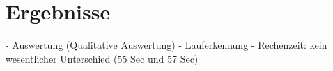\chapter{Ergebnisse}
- Auswertung (Qualitative Auswertung)
- Lauferkennung 
- Rechenzeit: kein wesentlicher Unterschied (55 Sec und 57 Sec)



 